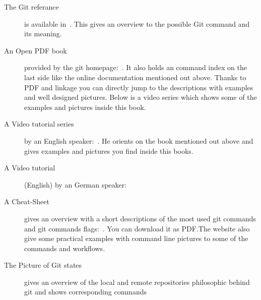 \begin{description}
    \item[The Git referance] is available in~\cite{gitdoc}. This gives
        an overview to the possible Git command and its meaning.
    \item[An Open PDF book] provided by the git homepage:~\cite{Chacon2014}. It
        also holds an command index on the last side like the online
        documentation mentioned out above. Thanks to PDF and linkage you
        can directly jump to the descriptions with examples and well designed
        pictures. Below is a video series which shows some of the examples and
        pictures inside this book.
    \item[A Video tutorial series] by an English
        speaker:~\cite{gitvideotutorial_en}.
        He orients on the book mentioned out above and gives examples and
        pictures you find inside this books.
    \item[A Video tutorial] (English) by an German
        speaker:~\cite{gitvideotutorial_de_en}
    \item[A Cheat-Sheet] gives an overview with a short descriptions of the most
        used git commands and git commands flags:~\cite{git_cheat_sheet}. You
        can download it as PDF.\@ The website also give some practical examples
        with command line pictures to some of the commands and workflows.
    \item[The Picture of Git states] gives an overview of the local and remote
        repositories philosophic behind git and shows corresponding
        commands~\cite{git_picture}
\end{description}
